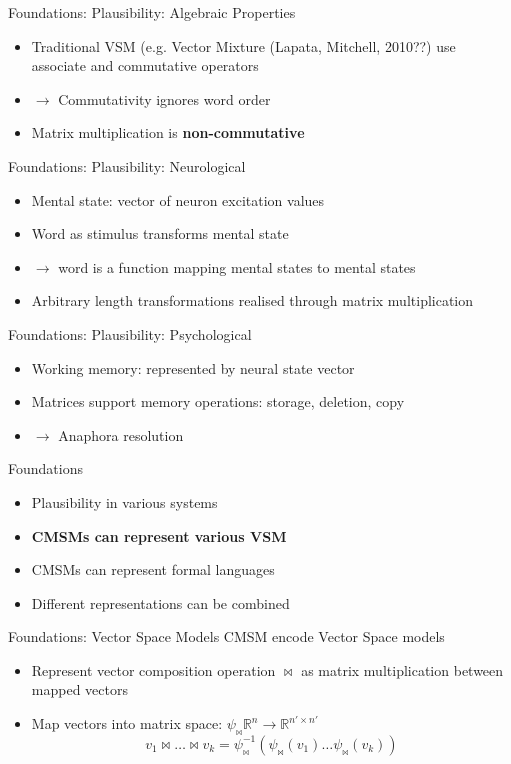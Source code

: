 \documentclass[12pt,a4paper]{beamer}
\begin{document}
\begin{frame}{Foundations: Plausibility: Algebraic Properties}
\begin{itemize}
\item Traditional VSM (e.g. Vector Mixture (Lapata, Mitchell, 2010??) 
 use associate and commutative operators
\item $\to$ Commutativity ignores word order
\item Matrix multiplication is \textbf{non-commutative}
\end{itemize}
\end{frame}

\begin{frame}{Foundations: Plausibility: Neurological}
\begin{itemize}
\item Mental state: vector of neuron excitation values
\item Word as stimulus transforms mental state
\item $\to$ word is a function mapping mental states to mental states
\item Arbitrary length transformations realised through matrix multiplication
\end{itemize}
\end{frame}

\begin{frame}{Foundations: Plausibility: Psychological}
\begin{itemize}
\item Working memory: represented by neural state vector %
\item Matrices support memory operations: storage, deletion, copy
\item $\to$ Anaphora resolution
\end{itemize}
\end{frame}

\begin{frame}{Foundations}
\begin{itemize}
\item Plausibility in various systems
\item \textbf{CMSMs can represent various VSM}
\item CMSMs can represent formal languages
\item Different representations can be combined
\end{itemize}
\end{frame}


\begin{frame}{Foundations: Vector Space Models}
CMSM encode Vector Space models
\begin{itemize}
\item Represent vector composition operation $\bowtie$ as matrix multiplication between mapped vectors
\item Map vectors into matrix space: $\psi_{\bowtie} \mathbb{R}^{n} \to \mathbb{R}^{n'\times n'} $
$$ v_{1} \bowtie \ldots \bowtie v_{k} = \psi_{\bowtie}^{-1}(\psi_{\bowtie}(v_{1}) \ldots \psi_{\bowtie}(v_{k}) )$$
\end{itemize}
\end{frame}
\end{document}
